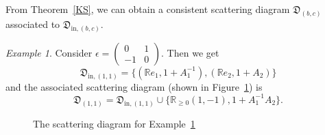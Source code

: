 \documentclass[12pt]{amsart}
\theoremstyle{remark}
\newtheorem{example}[theorem]{Example}
\newcommand{\RR}{\mathbb{R}}
\newcommand{\DD}{\mathfrak{D}}
\begin{document}
From Theorem~\ref{KS}, we can obtain a consistent scattering diagram $\DD_{(b,c)}$ 
associated to $\DD_{\mathrm{in},(b,c)}$.

\begin{example} \label{ex}
Consider $\epsilon =  \begin{pmatrix}
0 &1 \\
-1 &0
\end{pmatrix}$. 
Then we get
\[\DD_{\mathrm{in},(1,1)} =  \{ (\RR e_1, 1+A_1^{-1}), (\RR e_2, 1+A_2)  \}   \]
and the associated scattering diagram (shown in Figure~\ref{fig:diagex}) is
\[ \DD_{(1,1)} = \DD_{\mathrm{in},(1,1)} \cup \{\RR_{\geq 0} (1,-1), 1+A_1^{-1}A_2  \}.   \]

\begin{figure}
\centering
{}
\caption{The scattering diagram for Example~\ref{ex}} \label{fig:diagex}
\end{figure}
\end{example}
\end{document}
